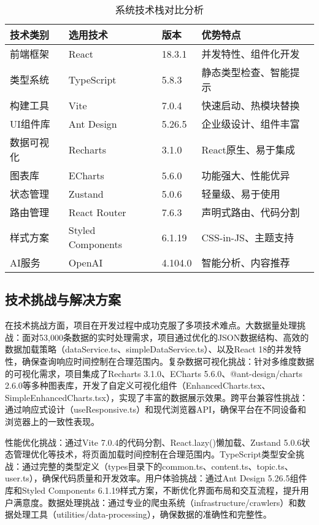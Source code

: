 \documentclass[12pt,a4paper]{article}
\begin{document}
\begin{table}[H]
\centering
\caption{系统技术栈对比分析}
\begin{tabular}{|p{2.5cm}|p{3cm}|p{2cm}|p{4cm}|}
\hline
\textbf{技术类别} & \textbf{选用技术} & \textbf{版本} & \textbf{优势特点} \\
\hline
前端框架 & React & 18.3.1 & 并发特性、组件化开发 \\
\hline
类型系统 & TypeScript & 5.8.3 & 静态类型检查、智能提示 \\
\hline
构建工具 & Vite & 7.0.4 & 快速启动、热模块替换 \\
\hline
UI组件库 & Ant Design & 5.26.5 & 企业级设计、组件丰富 \\
\hline
数据可视化 & Recharts & 3.1.0 & React原生、易于集成 \\
\hline
图表库 & ECharts & 5.6.0 & 功能强大、性能优异 \\
\hline
状态管理 & Zustand & 5.0.6 & 轻量级、易于使用 \\
\hline
路由管理 & React Router & 7.6.3 & 声明式路由、代码分割 \\
\hline
样式方案 & Styled Components & 6.1.19 & CSS-in-JS、主题支持 \\
\hline
AI服务 & OpenAI & 4.104.0 & 智能分析、内容推荐 \\
\hline
\end{tabular}
\end{table}



\subsection{技术挑战与解决方案}

在技术挑战方面，项目在开发过程中成功克服了多项技术难点。大数据量处理挑战：面对53,000条数据的实时处理需求，项目通过优化的JSON数据结构、高效的数据加载策略（dataService.ts、simpleDataService.ts）、以及React 18的并发特性，确保查询响应时间控制在合理范围内。复杂数据可视化挑战：针对多维度数据的可视化需求，项目集成了Recharts 3.1.0、ECharts 5.6.0、@ant-design/charts 2.6.0等多种图表库，开发了自定义可视化组件（EnhancedCharts.tsx、SimpleEnhancedCharts.tsx），实现了丰富的数据展示效果。跨平台兼容性挑战：通过响应式设计（useResponsive.ts）和现代浏览器API，确保平台在不同设备和浏览器上的一致性表现。

性能优化挑战：通过Vite 7.0.4的代码分割、React.lazy()懒加载、Zustand 5.0.6状态管理优化等技术，将页面加载时间控制在合理范围内。TypeScript类型安全挑战：通过完整的类型定义（types目录下的common.ts、content.ts、topic.ts、user.ts），确保代码质量和开发效率。用户体验挑战：通过Ant Design 5.26.5组件库和Styled Components 6.1.19样式方案，不断优化界面布局和交互流程，提升用户满意度。数据处理挑战：通过专业的爬虫系统（infrastructure/crawlers）和数据处理工具（utilities/data-processing），确保数据的准确性和完整性。
\end{document}
